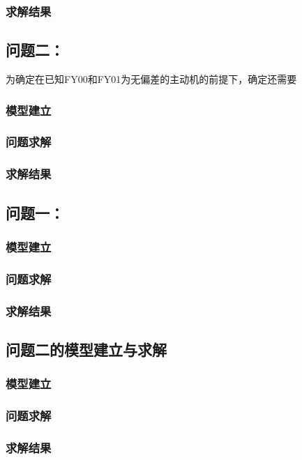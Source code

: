 \documentclass[withoutpreface,bwprint]{cumcmthesis} %
\begin{document}
\subsubsection{求解结果}




\subsection{问题二：}
为确定在已知FY00和FY01为无偏差的主动机的前提下，确定还需要
\subsubsection{模型建立}
\subsubsection{问题求解}
\subsubsection{求解结果}

\subsection{问题一：}
\subsubsection{模型建立}
\subsubsection{问题求解}
\subsubsection{求解结果}


\subsection{问题二的模型建立与求解}
\subsubsection{模型建立}
\subsubsection{问题求解}
\subsubsection{求解结果}
\end{document}
